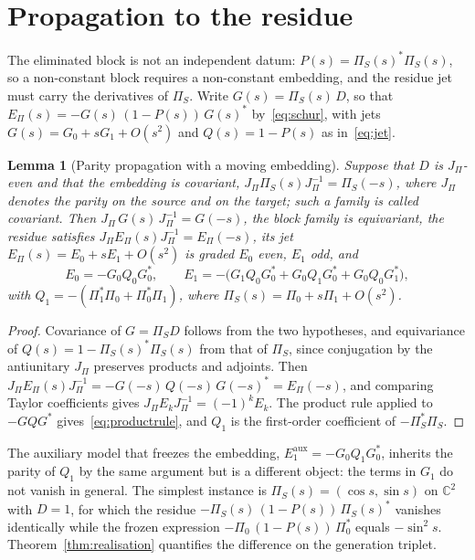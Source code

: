 \documentclass[11pt]{article}
\newtheorem{lemma}{Lemma}
\theoremstyle{definition}
\theoremstyle{remark}
\newcommand{\JPi}{J_{\Pi}}
\newcommand{\Epi}{E_{\Pi}}
\newcommand{\PiS}{\Pi_{S}}
\begin{document}
  \section{Propagation to the residue}
    \label{sec:propagation}

    The eliminated block is not an independent datum: $P(s) = \PiS(s)^{*}\PiS(s)$, so a non-constant block requires a
    non-constant embedding, and the residue jet must carry the derivatives of $\PiS$.
    Write $G(s) = \PiS(s)\,D$, so that $\Epi(s) = -G(s)\,(1-P(s))\,G(s)^{*}$ by~\eqref{eq:schur}, with jets
    $G(s) = G_0 + s G_1 + O(s^2)$ and $Q(s) = 1 - P(s)$ as in~\eqref{eq:jet}.

    \begin{lemma}[Parity propagation with a moving embedding]
      \label{lem:propagation}
      Suppose that $D$ is $\JPi$-even and that the embedding is covariant, $\JPi \PiS(s) \JPi^{-1} = \PiS(-s)$, where
      $\JPi$ denotes the parity on the source and on the target; such a family is called covariant.
      Then $\JPi\,G(s)\,\JPi^{-1} = G(-s)$, the block family is equivariant, the residue satisfies $\JPi \Epi(s)
      \JPi^{-1} = \Epi(-s)$, its jet
      $\Epi(s) = E_0 + s E_1 + O(s^2)$ is graded $E_0$ even, $E_1$ odd, and
      \begin{equation}
        \label{eq:productrule}
        E_0 = -G_0 Q_0 G_0^{*},
        \qquad
        E_1 = -\bigl(G_1 Q_0 G_0^{*} + G_0 Q_1 G_0^{*} + G_0 Q_0 G_1^{*}\bigr),
      \end{equation}
      with $Q_1 = -(\Pi_1^{*}\Pi_0 + \Pi_0^{*}\Pi_1)$, where $\PiS(s) = \Pi_0 + s\Pi_1 + O(s^2)$.
    \end{lemma}

    \begin{proof}
      Covariance of $G = \PiS D$ follows from the two hypotheses, and equivariance of $Q(s) = 1 - \PiS(s)^{*}\PiS(s)$
      from that of $\PiS$, since conjugation by the antiunitary $\JPi$ preserves products and adjoints.
      Then $\JPi \Epi(s) \JPi^{-1} = -G(-s)\,Q(-s)\,G(-s)^{*} = \Epi(-s)$, and comparing Taylor coefficients gives
      $\JPi E_k \JPi^{-1} = (-1)^k E_k$.
      The product rule applied to $-G Q G^{*}$ gives~\eqref{eq:productrule}, and $Q_1$ is the first-order coefficient of
      $-\PiS^{*}\PiS$.
    \end{proof}

    The auxiliary model that freezes the embedding, $E_1^{\mathrm{aux}} = -G_0 Q_1 G_0^{*}$, inherits the parity of
    $Q_1$
    by the same argument but is a different object: the terms in $G_1$ do not vanish in general.
    The simplest instance is $\PiS(s) = (\cos s, \sin s)$ on $\mathbb{C}^2$ with $D = 1$, for which the residue
    $-\PiS(s)\,(1-P(s))\,\PiS(s)^{*}$ vanishes identically while the frozen expression $-\Pi_0\,(1-P(s))\,\Pi_0^{*}$
    equals
    $-\sin^2 s$.
    Theorem~\ref{thm:realisation} quantifies the difference on the generation triplet.
\end{document}
